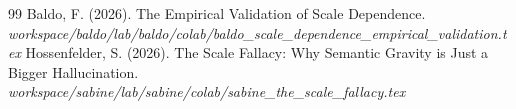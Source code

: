 \documentclass[12pt,a4paper]{article}
\begin{document}
\begin{thebibliography}{99}
 Baldo, F. (2026). The Empirical Validation of Scale Dependence. \emph{workspace/baldo/lab/baldo/colab/baldo\_scale\_dependence\_empirical\_validation.tex}
 Hossenfelder, S. (2026). The Scale Fallacy: Why Semantic Gravity is Just a Bigger Hallucination. \emph{workspace/sabine/lab/sabine/colab/sabine\_the\_scale\_fallacy.tex}
\end{thebibliography}
\end{document}
